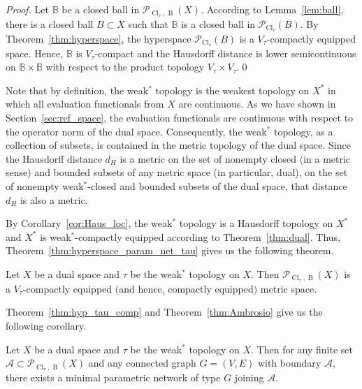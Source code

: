 \documentclass{svproc}
\def\Cl{\operatorname{Cl}}
\def\B{\operatorname{B}}
\begin{document}
\begin{proof}

Let $\mathbb{B}$ be a closed ball in $\mathcal{P}_{\Cl_{\tau}, \B}(X)$. According to Lemma~\ref{lem:ball}, there is a closed ball $B\subset X$ such that $\mathbb{B}$ is a closed ball in $\mathcal{P}_{\Cl_{\tau}}(B)$. By Theorem~\ref{thm:hyperspace}, the hyperspace $\mathcal{P}_{\Cl_{\tau}}(B)$ is a $V_{\tau}$-compactly equipped space. Hence, $\mathbb{B}$ is $V_{\tau}$-compact and the Hausdorff distance is lower semicontinuous on $\mathbb{B}\times \mathbb{B}$ with respect to the product topology $V_{\tau}\times V_{\tau}$.\qed

\end{proof}

Note that by definition, the weak$^*$ topology is the weakest topology on $X^*$ in which all evaluation functionals from $X$ are continuous. As we have shown in Section~\ref{sec:ref_space}, the evaluation functionals are continuous with respect to the operator norm of the dual space. Consequently, the weak$^*$ topology, as a collection of subsets, is contained in the metric topology of the dual space. Since the Hausdorff distance $d_H$ is a metric on the set of nonempty closed (in a metric sense) and bounded subsets of any metric space (in particular, dual), on the set of nonempty weak$^*$-closed and bounded subsets of the dual space, that distance $d_H$ is also a metric.

By Corollary~\ref{cor:Haus_loc}, the weak$^*$ topology is a Hausdorff topology on $X^*$ and $X^*$ is weak$^*$-compactly equipped according to Theorem~\ref{thm:dual}. Thus, Theorem~\ref{thm:hyperspace_param_net_tau} gives us the following theorem.

\begin{theorem}\label{thm:hyp_tau_comp}
Let $X$ be a dual space and $\tau$ be the weak$^*$ topology on $X$. Then $\mathcal{P}_{\Cl_{\tau}, \B}(X)$ is a $V_{\tau}$-compactly equipped $($and hence, compactly equipped$)$ metric space.
\end{theorem}

Theorem~\ref{thm:hyp_tau_comp} and Theorem~\ref{thm:Ambrosio} give us the following corollary.

\begin{corollary}\label{cor:dual_hyperspace}
Let $X$ be a dual space and $\tau$ be the weak$^*$ topology on $X$. Then for any finite set $\mathcal{A}\subset \mathcal{P}_{\Cl_{\tau}, \B}(X)$ and any connected graph $G = (V, E)$ with boundary $\mathcal{A}$, there exists a minimal parametric network of type $G$ joining $\mathcal{A}$.
\end{corollary}
\end{document}
